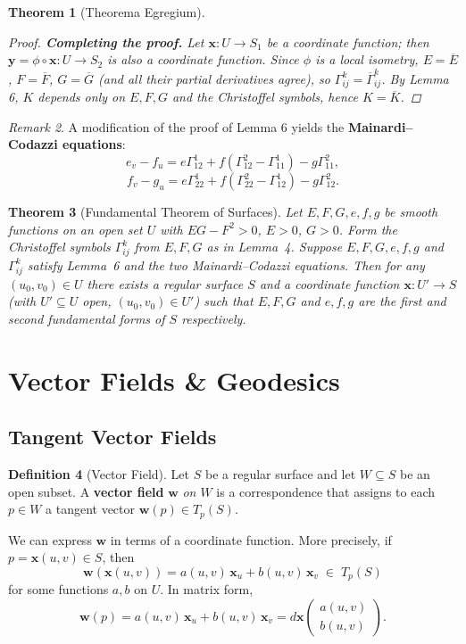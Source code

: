 \documentclass[10pt, a4paper]{article}
\theoremstyle{plain}
\newtheorem{theorem}{Theorem}[section]
\theoremstyle{definition}
\newtheorem{definition}[theorem]{Definition}
\theoremstyle{remark}
\newtheorem{remark}[theorem]{Remark}
\begin{document}
\begin{theorem}[Theorema Egregium]
\begin{proof}
\textbf{Completing the proof.} Let $\mathbf{x}: U \to S_1$ be a coordinate function;
then $\mathbf{y} = \phi \circ \mathbf{x}: U \to S_2$ is also a coordinate function. Since
$\phi$ is a local isometry, $E = \overline{E}$, $F = \overline{F}$, $G = \overline{G}$
(and all their partial derivatives agree), so $\Gamma_{ij}^k = \overline{\Gamma}_{ij}^k$.
By Lemma 6, $K$ depends only on $E, F, G$ and the Christoffel symbols, hence $K = \overline{K}$.
\end{proof}

\end{theorem}


\begin{remark}
A modification of the proof of Lemma 6 yields the \textbf{Mainardi--Codazzi equations}:
\[
  e_v - f_u = e\Gamma_{12}^1 + f(\Gamma_{12}^2 - \Gamma_{11}^1) - g\Gamma_{11}^2,
\]
\[
  f_v - g_u = e\Gamma_{22}^1 + f(\Gamma_{22}^2 - \Gamma_{12}^1) - g\Gamma_{12}^2.
\]
\end{remark}

\begin{theorem}[Fundamental Theorem of Surfaces]
  Let $E, F, G, e, f, g$ be smooth functions on an open set $U$ with $EG - F^2 > 0$,
  $E > 0$, $G > 0$. Form the Christoffel symbols $\Gamma_{ij}^k$ from $E, F, G$ as in
  Lemma~4. Suppose $E, F, G, e, f, g$ and $\Gamma_{ij}^k$ satisfy Lemma~6 and the two
  Mainardi--Codazzi equations. Then for any $(u_0, v_0) \in U$ there exists a regular
  surface $S$ and a coordinate function $\mathbf{x}: U' \to S$ (with $U' \subseteq U$
  open, $(u_0, v_0) \in U'$) such that $E, F, G$ and $e, f, g$ are the first and second
  fundamental forms of $S$ respectively.
\end{theorem}

\pagebreak

\section{Vector Fields \& Geodesics}


\subsection{Tangent Vector Fields}

\begin{definition}[Vector Field]
  Let $S$ be a regular surface and let $W \subseteq S$ be an open subset. A \textbf{vector
  field} $\mathbf{w}$ \emph{on $W$} is a correspondence that assigns to each $p \in W$ a
  tangent vector $\mathbf{w}(p) \in T_p(S)$.

  We can express $\mathbf{w}$ in terms of a coordinate function. More precisely, if
  $p = \mathbf{x}(u,v) \in S$, then
  \[
    \mathbf{w}(\mathbf{x}(u,v)) = a(u,v)\,\mathbf{x}_u + b(u,v)\,\mathbf{x}_v \;\in\; T_p(S)
  \]
  for some functions $a, b$ on $U$. In matrix form,
  \[
    \mathbf{w}(p) = a(u,v)\,\mathbf{x}_u + b(u,v)\,\mathbf{x}_v
    = d\mathbf{x}\begin{pmatrix} a(u,v) \\ b(u,v) \end{pmatrix}.
  \]
\end{definition}
\end{document}
